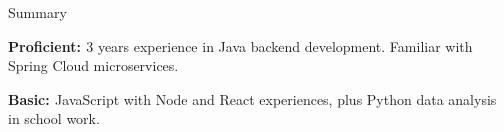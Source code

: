 \documentclass{resume} %
\begin{document}
\begin{skillSection}{Summary}
\item {\bf{Proficient: }}3 years experience in Java backend development. Familiar with Spring Cloud microservices.
\item {\bf{Basic: }}JavaScript with Node and React experiences, plus Python data analysis in school work.
\end{skillSection}

\end{document}
